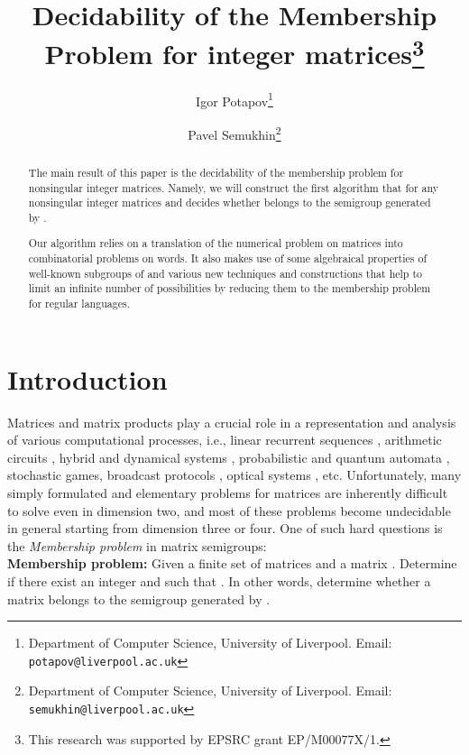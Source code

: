 \documentclass[fontsize=11pt,DIV=13,paper=letter]{scrartcl}
\theoremstyle{definition}
\begin{document}
\title{\Large Decidability of the Membership Problem for  integer matrices\thanks{This research was supported by EPSRC grant EP/M00077X/1.}}

\author{\large Igor Potapov\thanks{Department of Computer Science, University of Liverpool. Email: {\tt potapov@liverpool.ac.uk}}
\and \large Pavel Semukhin\thanks{Department of Computer Science, University of Liverpool. Email: {\tt semukhin@liverpool.ac.uk}}}
\date{}

\maketitle

\begin{abstract}
The main result of this paper is the decidability of the membership problem for  nonsingular integer matrices. Namely, we will construct the first algorithm that for any nonsingular  integer matrices  and  decides whether  belongs to the semigroup generated by .

Our algorithm relies on a translation of the numerical problem on matrices into combinatorial problems on words. It also makes use of some algebraical properties of well-known subgroups of  and various new techniques and constructions that help to limit an infinite number of possibilities by reducing them to the membership problem for regular languages.
\end{abstract}

\section{Introduction}
Matrices and matrix products play a crucial role in a representation and analysis of various computational processes, 
i.e., linear recurrent sequences \cite{tHaHaHiKa05a,OW_ICALP2015-1,OW_ICALP2015-2}, arithmetic circuits \cite{GOW_STACS2015}, 
hybrid and dynamical systems \cite{OSW2015, BP2008},
probabilistic and quantum automata \cite{Blondel2005}, stochastic
games, broadcast protocols \cite{EFM1999},  optical systems \cite{GB94}, etc. 
Unfortunately, many simply formulated and elementary problems for matrices are inherently difficult to solve
even in dimension two, and most of these problems 
become undecidable in general starting from dimension three or four.
One of such hard questions is the {\sl Membership problem} in matrix semigroups:\\

\noindent
{\bf Membership problem:} Given a finite set of  matrices   and a matrix .
Determine if there exist an integer  and  such that 
.
In other words, determine whether a matrix  belongs to the semigroup generated by .\\
\end{document}
